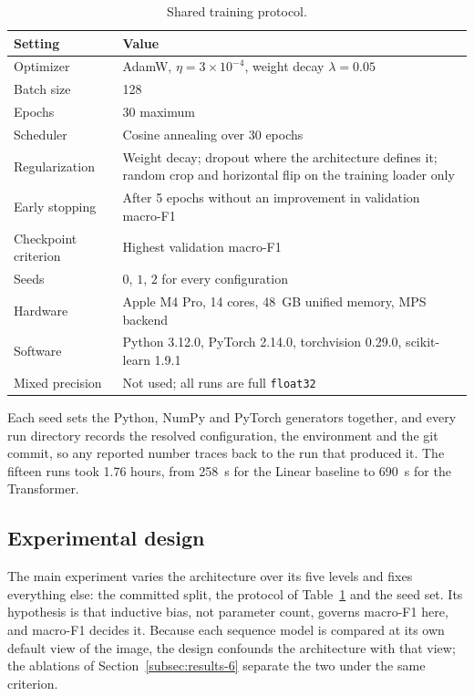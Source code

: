 \begin{table}[H]
\centering
\caption{Shared training protocol.}
\label{tab:protocol}
\begin{tabularx}{\textwidth}{lX}
\hline
\textbf{Setting} & \textbf{Value} \\
\hline
Optimizer            & AdamW, $\eta = 3 \times 10^{-4}$, weight decay $\lambda = 0.05$ \\
Batch size           & 128 \\
Epochs               & 30 maximum \\
Scheduler            & Cosine annealing over 30 epochs \\
Regularization       & Weight decay; dropout where the architecture defines it; random crop and horizontal flip on the training loader only \\
Early stopping       & After 5 epochs without an improvement in validation macro-F1 \\
Checkpoint criterion & Highest validation macro-F1 \\
Seeds                & $0$, $1$, $2$ for every configuration \\
Hardware             & Apple M4 Pro, 14 cores, 48~GB unified memory, MPS backend \\
Software             & Python 3.12.0, PyTorch 2.14.0, torchvision 0.29.0, scikit-learn 1.9.1 \\
Mixed precision      & Not used; all runs are full \texttt{float32} \\
\hline
\end{tabularx}
\end{table}

Each seed sets the Python, NumPy and PyTorch generators together, and every run directory records
the resolved configuration, the environment and the git commit, so any reported number traces
back to the run that produced it. The fifteen runs took 1.76 hours, from 258~s for the Linear
baseline to 690~s for the Transformer.

\subsection{Experimental design}
\label{subsec:methodology-4}

The main experiment varies the architecture over its five levels and fixes everything else: the
committed split, the protocol of Table~\ref{tab:protocol} and the seed set. Its hypothesis is
that inductive bias, not parameter count, governs macro-F1 here, and macro-F1 decides it.
Because each sequence model is compared at its own default view of the image, the design
confounds the architecture with that view; the ablations of Section~\ref{subsec:results-6}
separate the two under the same criterion.

